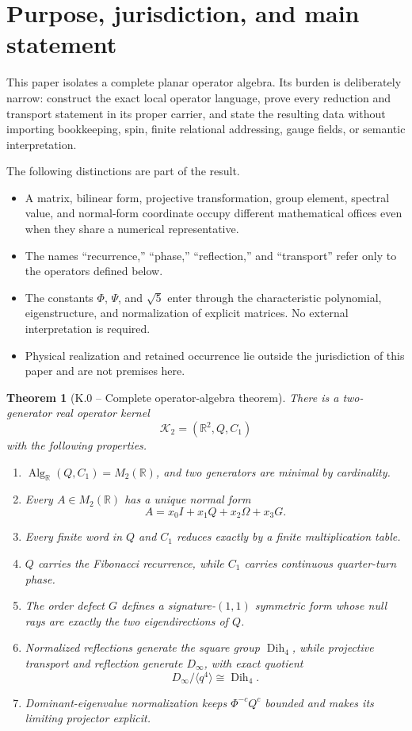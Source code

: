 \documentclass[11pt,letterpaper]{article}
\theoremstyle{kernelstyle}
\newtheorem{theorem}{Theorem}[section]
\newcommand{\R}{\mathbb{R}}
\newcommand{\Alg}{\operatorname{Alg}}
\newcommand{\Dih}{\operatorname{Dih}}
\begin{document}
\tableofcontents
\clearpage

\section{Purpose, jurisdiction, and main statement}

This paper isolates a complete planar operator algebra. Its burden is deliberately narrow: construct the exact local operator language, prove every reduction and transport statement in its proper carrier, and state the resulting data without importing bookkeeping, spin, finite relational addressing, gauge fields, or semantic interpretation.

\begin{boundarybox}
The following distinctions are part of the result.
\begin{itemize}
  \item A matrix, bilinear form, projective transformation, group element, spectral value, and normal-form coordinate occupy different mathematical offices even when they share a numerical representative.
  \item The names ``recurrence,'' ``phase,'' ``reflection,'' and ``transport'' refer only to the operators defined below.
  \item The constants $\Phi$, $\Psi$, and $\sqrt5$ enter through the characteristic polynomial, eigenstructure, and normalization of explicit matrices.  No external interpretation is required.
  \item Physical realization and retained occurrence lie outside the jurisdiction of this paper and are not premises here.
\end{itemize}
\end{boundarybox}

\begin{theorem}[K.0 -- Complete operator-algebra theorem]\label{thm:main}
There is a two-generator real operator kernel
\[
\mathcal K_2=(\R^2,Q,C_1)
\]
with the following properties.
\begin{enumerate}
  \item $\Alg_{\R}(Q,C_1)=M_2(\R)$, and two generators are minimal by cardinality.
  \item Every $A\in M_2(\R)$ has a unique normal form
  \[
  A=x_0I+x_1Q+x_2\Omega+x_3G.
  \]
  \item Every finite word in $Q$ and $C_1$ reduces exactly by a finite multiplication table.
  \item $Q$ carries the Fibonacci recurrence, while $C_1$ carries continuous quarter-turn phase.
  \item The order defect $G$ defines a signature-$(1,1)$ symmetric form whose null rays are exactly the two eigendirections of $Q$.
  \item Normalized reflections generate the square group $\Dih_4$, while projective transport and reflection generate $D_\infty$, with exact quotient
  \[
  D_\infty/\langle q^4\rangle\cong\Dih_4.
  \]
  \item Dominant-eigenvalue normalization keeps $\Phi^{-c}Q^c$ bounded and makes its limiting projector explicit.
\end{enumerate}
\end{theorem}
\end{document}
